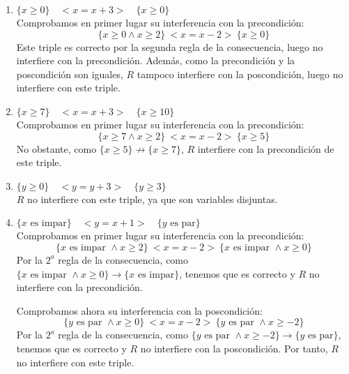 \begin{ejercicio}
\begin{enumerate}
        \item $\{x \geq 0\} \quad < x = x + 3 > \quad \{x \geq 0\}$\\
            Comprobamos en primer lugar su interferencia con la precondición:
            \begin{equation*}
                \{x\geq 0 \land x \geq 2\}\ <x=x-2>\ \{x\geq 0\}
            \end{equation*}
            Este triple es correcto por la segunda regla de la consecuencia, luego no interfiere con la precondición.
            Además, como la precondición y la poscondición son iguales, $R$ tampoco interfiere con la poscondición, luego no interfiere con este triple.
        \item $\{x \geq 7\} \quad < x = x + 3 > \quad \{x \geq 10\}$\\
            Comprobamos en primer lugar su interferencia con la precondición:
            \begin{equation*}
                \{x\geq 7 \land x \geq 2\}\ <x=x-2>\ \{x\geq 5\}
            \end{equation*}
            No obstante, como $\{x\geq 5\}\not\rightarrow\{x\geq 7\}$, $R$ interfiere con la precondición de este triple.
        \item $\{y \geq 0\} \quad < y = y + 3 > \quad \{y \geq 3\}$\\
            $R$ no interfiere con este triple, ya que son variables disjuntas.
        \item $\{x \text{ es impar}\} \quad < y = x + 1 > \quad \{y \text{ es par}\}$\\
            Comprobamos en primer lugar su interferencia con la precondición:
            \begin{equation*}
                \{x \text{ es impar } \land x\geq 2\}\ <x=x-2>\ \{x \text{ es impar } \land x \geq 0\}
            \end{equation*}
            Por la $2^a$ regla de la consecuencia, como $\{x \text{ es impar } \land x \geq 0\} \rightarrow \{x \text{ es impar}\}$, tenemos que es correcto y $R$ no interfiere con la precondición.

            Comprobamos ahora su interferencia con la poscondición:
            \begin{equation*}
                \{y \text{ es par } \land x \geq 0\}\ <x=x-2>\ \{y \text{ es par } \land x \geq -2\}
            \end{equation*}
            Por la $2^a$ regla de la consecuencia, como $\{y \text{ es par } \land x \geq -2\} \rightarrow \{y \text{ es par}\}$, tenemos que es correcto y $R$ no interfiere con la poscondición. Por tanto, $R$ no interfiere con este triple.
            
    \end{enumerate}
\end{ejercicio}

